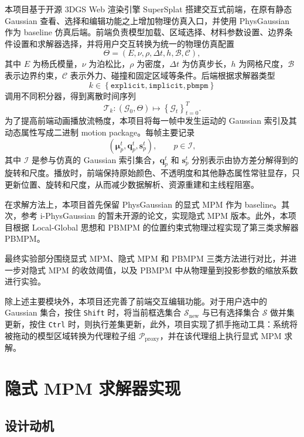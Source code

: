 \documentclass[a4paper]{article}
\begin{document}
本项目基于开源 3DGS Web 渲染引擎 SuperSplat 搭建交互式前端，在原有静态 Gaussian 查看、选择和编辑功能之上增加物理仿真入口，并使用 PhysGaussian 作为 baseline 仿真后端。前端负责模型加载、区域选择、材料参数设置、边界条件设置和求解器选择，并将用户交互转换为统一的物理仿真配置
\[
    \Theta
    =
    \left(
        E,\nu,\rho,\Delta t,h,\mathcal{B},\mathcal{C}
    \right),
\]
其中 $E$ 为杨氏模量，$\nu$ 为泊松比，$\rho$ 为密度，$\Delta t$ 为仿真步长，$h$ 为网格尺度，$\mathcal{B}$ 表示边界约束，$\mathcal{C}$ 表示外力、碰撞和固定区域等条件。后端根据求解器类型
\[
    k\in
    \left\{
        \texttt{explicit},
        \texttt{implicit},
        \texttt{pbmpm}
    \right\}
\]
调用不同积分器，得到离散时间序列
\[
    \mathcal{T}_k:
    \left(
        \mathcal{G}_0,\Theta
    \right)
    \longmapsto
    \left\{
        \mathcal{G}_t
    \right\}_{t=0}^{T}.
\]
为了提高前端动画播放流畅度，本项目将每一帧中发生运动的 Gaussian 索引及其动态属性写成二进制 motion package。每帧主要记录
\[
    \left(
        \bm{\mu}_p^t,
        \bm{q}_p^t,
        \bm{s}_p^t
    \right),
    \qquad p\in \mathcal{I},
\]
其中 $\mathcal{I}$ 是参与仿真的 Gaussian 索引集合，$\bm{q}_p^t$ 和 $\bm{s}_p^t$ 分别表示由协方差分解得到的旋转和尺度。播放时，前端保持原始颜色、不透明度和其他静态属性常驻显存，只更新位置、旋转和尺度，从而减少数据解析、资源重建和主线程阻塞。

在求解方法上，本项目首先保留 PhysGaussian 的显式 MPM 作为 baseline。其次，参考 i-PhysGaussian 的暂未开源的论文，实现隐式 MPM 版本。此外，本项目根据 Local-Global 思想和 PBMPM 的位置约束式物理过程实现了第三类求解器 PBMPM。

最终实验部分围绕显式 MPM、隐式 MPM 和 PBMPM 三类方法进行对比，并进一步对隐式 MPM 的收敛阈值，以及 PBMPM 中从物理量到投影参数的缩放系数进行实验。

除上述主要模块外，本项目还完善了前端交互编辑功能。对于用户选中的 Gaussian 集合，按住 \texttt{Shift} 时，将当前框选集合 $\mathcal{S}_{\mathrm{new}}$ 与已有选择集合 $\mathcal{S}$ 做并集更新，按住 \texttt{Ctrl} 时，则执行差集更新，此外，项目实现了抓手拖动工具：系统将被拖动的模型区域转换为代理粒子组 $\mathcal{P}_{\mathrm{proxy}}$，并在该代理组上执行显式 MPM 求解。


\section{隐式 MPM 求解器实现}

\subsection{设计动机}
\end{document}
